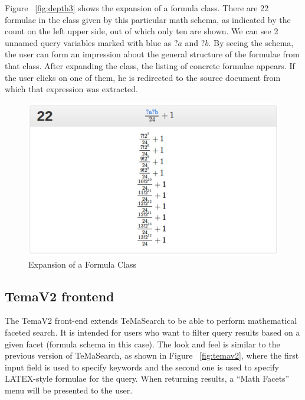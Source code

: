 \documentclass{deliverablereport}
\begin{document}
Figure ~\ref{fig:depth3} shows the expansion of a formula class. There are 22 formulae in the class given by this particular math schema, as indicated by the count on the left upper side, out of which only ten are shown. We can see 2 unnamed query variables marked with blue as $?a$ and $?b$. By seeing the schema, the user can form an impression about the general structure of the formulae from that class. After expanding the class, the listing of concrete formulae appears. If the user clicks on one of them, he is redirected to the source document from which that expression was extracted. 

\begin{figure}[H]
\centering
 \includegraphics[scale=0.8]{figure7.jpg}
 \caption{Expansion of a Formula Class}
 \label{fig:formula_class}
\end{figure}

\subsection{TemaV2 frontend}\label{v2}

The TemaV2 front-end extends TeMaSearch to be able to perform mathematical faceted search. It is intended for users who want to filter query results based on a given facet (formula schema in this case). The look and feel is similar to the previous version of TeMaSearch, as shown in Figure ~\ref{fig:temav2}, where the first input field is used to specify keywords and the second one is used to specify LATEX-style formulae for the query. When returning results, a “Math Facets” menu will be presented to the user. ~\cite{Ham:bcs15} 
\end{document}

